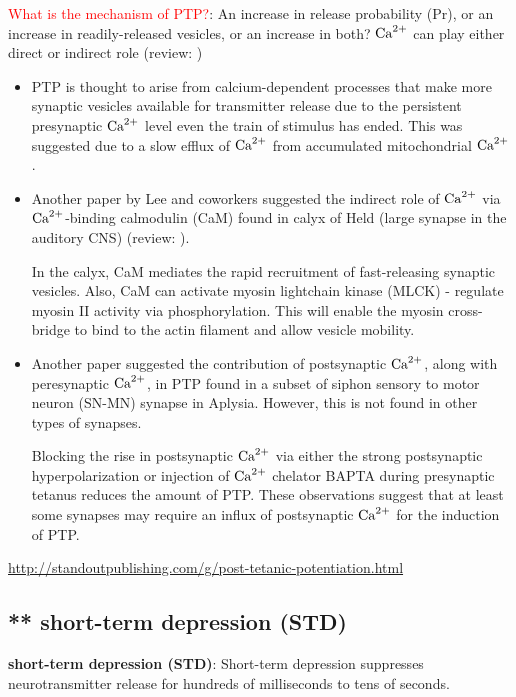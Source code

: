   \textcolor{red}{What is the mechanism of PTP?}: An increase in release
  probability (Pr), or an increase in readily-released vesicles, or an increase
  in both? ${\text{Ca}^{2+}}$ can play either direct or indirect role (review:
  \citep{zucker2002})
  \begin{itemize}
    \item 
  PTP is thought to arise from calcium-dependent processes that make
  more synaptic vesicles available for transmitter release due to the persistent
  presynaptic ${\text{Ca}^{2+}}$ level even the train of stimulus has ended. This was
  suggested due to a slow efflux of ${\text{Ca}^{2+}}$ from accumulated mitochondrial ${\text{Ca}^{2+}}$
  \citep{tang1997}. 
  
    \item Another paper by Lee and coworkers suggested the indirect role of
    ${\text{Ca}^{2+}}$ via ${\text{Ca}^{2+}}$-binding calmodulin (CaM) found in calyx of Held (large synapse in the
  auditory CNS) (review: \citep{balakrishnan2010}).
  
  In the calyx, CaM mediates the rapid recruitment of fast-releasing synaptic
  vesicles. Also, CaM can activate myosin lightchain kinase (MLCK) - regulate
  myosin II activity via phosphorylation. This will enable the myosin
  cross-bridge to bind to the actin filament and allow vesicle mobility.
  
    \item Another paper suggested the contribution of postsynaptic ${\text{Ca}^{2+}}$, along
    with peresynaptic ${\text{Ca}^{2+}}$, in PTP found in a subset of siphon sensory to motor
    neuron (SN-MN) synapse in Aplysia\citep{schaffhausen2001}. However, this is not
    found in other types of synapses.
    
    Blocking the rise in postsynaptic ${\text{Ca}^{2+}}$ via either the strong postsynaptic
    hyperpolarization or injection of ${\text{Ca}^{2+}}$ chelator BAPTA during presynaptic
    tetanus reduces the amount of PTP. These observations suggest that at least
    some synapses may require an influx of postsynaptic ${\text{Ca}^{2+}}$ for the induction of PTP.
  \end{itemize}
  \url{http://standoutpublishing.com/g/post-tetanic-potentiation.html}

\subsection{** short-term depression (STD)}

{\bf short-term depression (STD)}: Short-term depression
suppresses neurotransmitter release for hundreds of milliseconds to tens of
seconds.


